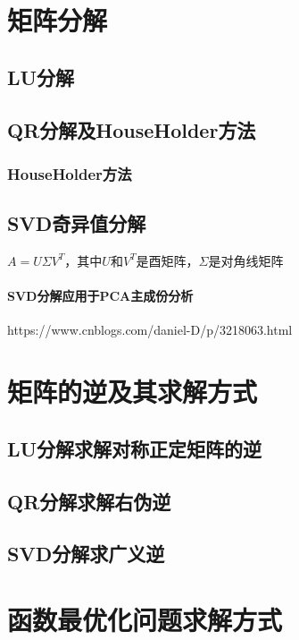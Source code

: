 \chapter{矩阵分解}\label{MathTools:chap:matrix_decomposition}
\section{LU分解}\label{MathTools:sec:lu_decomposition}
\section{QR分解及HouseHolder方法}\label{MathTools:sec:qr_decomposition}
\subsection{HouseHolder方法}\label{MathTools:sec:householder}
\section{SVD奇异值分解}\label{MathTools:sec:svd}
\begin{theorembox}
	$A = U\Sigma V^T$，其中$U$和$V^T$是酉矩阵，$\Sigma$是对角线矩阵
\end{theorembox}
\subsubsection{SVD分解应用于PCA主成份分析}
https://www.cnblogs.com/daniel-D/p/3218063.html
\chapter{矩阵的逆及其求解方式}\label{MathTools:chap:matrix_inverse}
\section{LU分解求解对称正定矩阵的逆}\label{MathTools:sec:lu_inverse}
\section{QR分解求解右伪逆}\label{MathTools:sec:qr_pseudoinverse}
\section{SVD分解求广义逆}\label{MathTools:sec:svd_pseudoinverse}



\chapter{函数最优化问题求解方式}\label{MathTools:chap:optimization}

